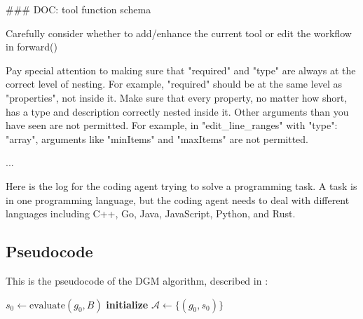 \documentclass{article} %
\begin{document}
\begin{tcolorbox}[breakable,colback=orange!5!white, colframe=orange!80!black, title=Additional Prompt for o3-mini Tool Use and Polyglot]
\scriptsize
\begin{MyVerbatim}
### DOC: tool function schema

Carefully consider whether to add/enhance the current tool or edit the workflow in forward()

Pay special attention to making sure that "required" and "type" are always at the correct level of nesting. For example, "required" should be at the same level as "properties", not inside it.
Make sure that every property, no matter how short, has a type and description correctly nested inside it.
Other arguments than you have seen are not permitted. For example, in "edit_line_ranges" with "type": "array", arguments like "minItems" and "maxItems" are not permitted.

...

Here is the log for the coding agent trying to solve a programming task. 
A task is in one programming language, but the coding agent needs to deal with different languages including C++, Go, Java, JavaScript, Python, and Rust.
\end{MyVerbatim}
\end{tcolorbox}


\subsection{Pseudocode}
\label{app:pseudocode}

This is the pseudocode of the DGM algorithm, described in :

\begin{algorithm}[H]
\DontPrintSemicolon
\SetAlgoLined
{}
\BlankLine
$s_0 \leftarrow \text{evaluate}(g_0, B)$ 
\textbf{initialize} $\mathcal{A} \leftarrow \{(g_0, s_0)\}$ 
\caption{Darwin Gödel Machine}
\label{alg:dgm}
\end{algorithm}
\end{document}
